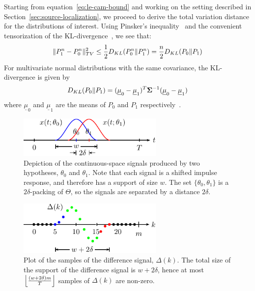 \documentclass[conference]{IEEEtran}
\providecommand{\v}{}
\renewcommand{\v}[1]{\underline{#1}}
\providecommand{\m}{}
\renewcommand{\m}[1]{{\bf #1}}
\DeclarePairedDelimiter\norm{\lVert}{\rVert}
\DeclarePairedDelimiter\floor{\lfloor}{\rfloor}
\begin{document}
\begin{IEEEproof}
Starting from equation~\eqref{eq:le-cam-bound} and working on the setting
described in Section~\ref{sec:source-localization}, we proceed to derive the
total variation distance for the distributions of interest. Using Pinsker's
inequality~\cite{Kullback1967Lower} and the convenient tensorization of the
KL-divergence~\cite{Duchi2015Information}, we see that:
\begin{equation} \label{eq:pinsker-tensorization}
	\norm{P_1^n - P_0^n}_{TV}^2 \leq \frac{1}{2} D_{KL}(P_0^n \Vert P_1^n) = \frac{n}{2} D_{KL}(P_0 \Vert P_1)
\end{equation}
For multivariate normal distributions with the same covariance, the
KL-divergence is given by
\begin{equation} \label{eq:kl-div-normal}
	D_{KL}(P_0 \Vert P_1) = (\v \mu_0 - \v \mu_1)^T \m \Sigma^{-1} (\v \mu_0 - \v \mu_1)
\end{equation}
where $\v \mu_0$ and $\v \mu_1$ are the means of $P_0$ and $P_1$
respectively~\cite{DuchiDerivation}.

\begin{figure}[t]
	\centering
	\includegraphics[width=2.8in]{overlap-middle-pics}
	\caption{Depiction of the continuous-space signals produced by two
		hypotheses, $\theta_0$ and $\theta_1$. Note that each signal is a
		shifted impulse response, and therefore has a support of size $w$.
		The set $\{\theta_0, \theta_1\}$ is a $2\delta$-packing of
		$\Theta$, so the signals are separated by a distance $2\delta$.}
	\label{fig:overlap-middle}
\end{figure}

\begin{figure}[t]
	\centering
	\includegraphics[width=2.8in]{delta-sampled-pics}
	\caption{Plot of the samples of the difference signal, $\Delta(k)$. The
		total size of the support of the difference signal is $w+2\delta$,
		hence at most $\floor*{\frac{(w + 2\delta)m}{T}}$ samples of
		$\Delta(k)$ are non-zero.}
	\label{fig:delta-sampled}
\end{figure}


\end{IEEEproof}
\end{document}
